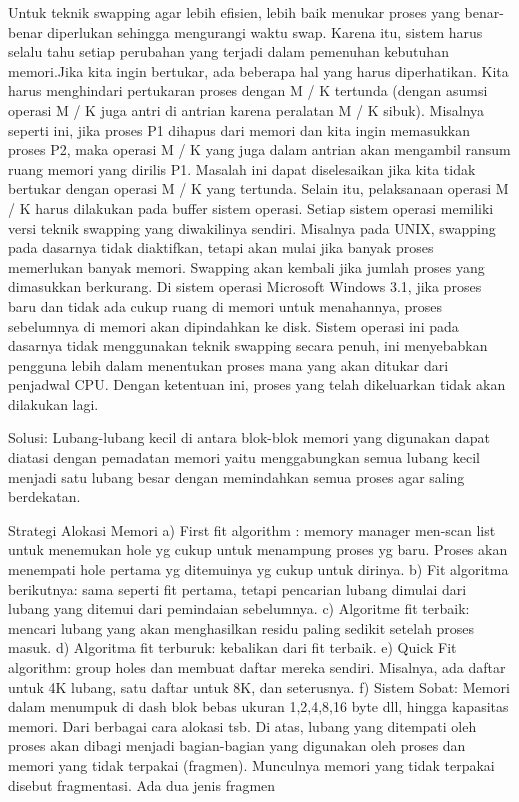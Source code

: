 Untuk teknik swapping agar lebih efisien, lebih baik menukar proses yang benar-benar diperlukan sehingga mengurangi waktu swap. Karena itu, sistem harus selalu tahu setiap perubahan yang terjadi dalam pemenuhan kebutuhan memori.Jika kita ingin bertukar, ada beberapa hal yang harus diperhatikan. Kita harus menghindari pertukaran proses dengan M / K tertunda (dengan asumsi operasi M / K juga antri di antrian karena peralatan M / K sibuk). Misalnya seperti ini, jika proses P1 dihapus dari memori dan kita ingin memasukkan proses P2, maka operasi M / K yang juga dalam antrian akan mengambil ransum ruang memori yang dirilis P1. Masalah ini dapat diselesaikan jika kita tidak bertukar dengan operasi M / K yang tertunda. Selain itu, pelaksanaan operasi M / K harus dilakukan pada buffer sistem operasi.
Setiap sistem operasi memiliki versi teknik swapping yang diwakilinya sendiri. Misalnya pada UNIX, swapping pada dasarnya tidak diaktifkan, tetapi akan mulai jika banyak proses memerlukan banyak memori. Swapping akan kembali jika jumlah proses yang dimasukkan berkurang. Di sistem operasi Microsoft Windows 3.1, jika proses baru dan tidak ada cukup ruang di memori untuk menahannya, proses sebelumnya di memori akan dipindahkan ke disk. Sistem operasi ini pada dasarnya tidak menggunakan teknik swapping secara penuh, ini menyebabkan pengguna lebih dalam menentukan proses mana yang akan ditukar dari penjadwal CPU. Dengan ketentuan ini, proses yang telah dikeluarkan tidak akan dilakukan lagi.

{Solusi}:
Lubang-lubang kecil di antara blok-blok memori yang digunakan dapat diatasi dengan pemadatan memori yaitu menggabungkan semua lubang kecil menjadi satu lubang besar dengan memindahkan semua proses agar saling berdekatan.
 
Strategi Alokasi Memori
a) First fit algorithm : memory  manager men-scan list untuk  menemukan hole yg cukup untuk menampung proses yg baru. Proses akan menempati hole pertama yg ditemuinya yg cukup untuk dirinya.
b) Fit algoritma berikutnya: sama seperti fit pertama, tetapi pencarian lubang dimulai dari lubang yang ditemui dari pemindaian sebelumnya.
c) Algoritme fit terbaik: mencari lubang yang akan menghasilkan residu paling sedikit setelah proses masuk.
d) Algoritma fit terburuk: kebalikan dari fit terbaik.
e) Quick Fit algorithm: group holes dan membuat daftar mereka sendiri. Misalnya, ada daftar untuk 4K lubang, satu daftar untuk 8K, dan seterusnya.
f) Sistem Sobat: Memori dalam menumpuk di dash blok bebas ukuran 1,2,4,8,16 byte dll, hingga kapasitas memori.
Dari berbagai cara alokasi tsb. Di atas, lubang yang ditempati oleh proses akan dibagi menjadi bagian-bagian yang digunakan oleh proses dan memori yang tidak terpakai (fragmen). Munculnya memori yang tidak terpakai disebut fragmentasi. Ada dua jenis fragmen

